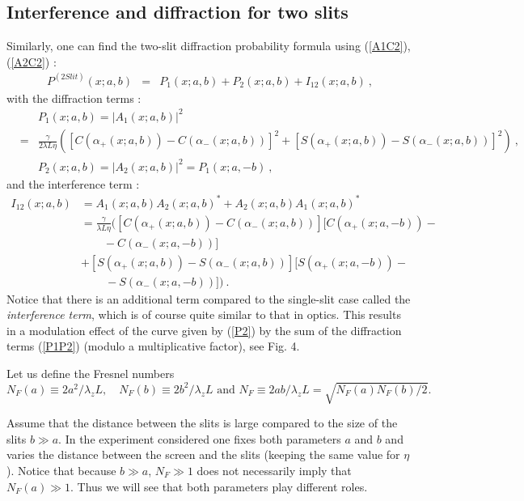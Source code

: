 \documentclass[12pt,aps,prb,preprint]{revtex4-1}   %
\begin{document}
\subsection{Interference and diffraction for two slits}
Similarly, one can find the two-slit diffraction probability
formula using (\ref{A1C2}), (\ref{A2C2}) :
\begin{eqnarray}\label{P2}
P^{(2 Slit)}(x;a,b) &=& P_1(x;a,b)+P_2(x;a,b)+I_{12}(x;a,b)\ ,
\end{eqnarray}
with the diffraction terms :
\begin{eqnarray}\label{P1P2}
&&P_1(x;a,b)= |A_1(x;a,b)|^2
{}\nonumber\\{}&=&\frac{\gamma}{2\lambda
L\eta}\left([C(\alpha_{+}(x;a,b))-C(\alpha_{-}(x;a,b))]^2+[S(\alpha_{+}(x;a,b))-S(\alpha_{-}(x;a,b))]^2\right)\
, {}\nonumber\\{}&& P_2(x;a,b) = |A_2(x;a,b)|^2 = P_1(x;a,-b)\ ,
\end{eqnarray}
and the interference term :
\begin{align}\label{I12}
I_{12}(x;a,b)&=A_1(x;a,b)A_2(x;a,b)^* + A_2(x;a,b) A_1(x;a,b)^*
{}\nonumber\\{}&=\frac{\gamma}{\lambda L\eta}
([C(\alpha_{+}(x;a,b))- C(\alpha_{-}(x;a,b))][C(\alpha_{+}(x;a,-b))- \nonumber\\ & \quad\quad - C(\alpha_{-}(x;a,-b))]
{}\nonumber\\{}&+[S(\alpha_{+}(x;a,b))-S(\alpha_{-}(x;a,b))][S(\alpha_{+}(x;a,-b))- \nonumber\\ & \quad\quad\, - S(\alpha_{-}(x;a,-b))])\ .
\end{align}
Notice that there is an additional term compared to the
single-slit case called the \textit{interference term}, which is
of course quite similar to that in optics.\cite{Optics} This
results in a modulation effect of the curve given by (\ref{P2}) by
the sum of the diffraction terms (\ref{P1P2}) (modulo a
multiplicative factor), see Fig. 4.

Let us define the Fresnel numbers
$$ N_F(a)\equiv2a^2/\lambda_z L, \quad
N_F(b)\equiv2b^2/\lambda_z L \mbox{ and } N_F\equiv2ab/\lambda_z L =
\sqrt{N_F(a)N_F(b)/2}.  $$


Assume that the distance between the slits is large compared to
the size of the slits $b\gg a$. In the experiment considered one
fixes both parameters $a$ and $b$ and varies the distance between
the screen and the slits (keeping the same value for $\eta$).
Notice that because $b\gg a$, $N_F\gg 1$ does not necessarily
imply that $N_F(a)\gg1$. Thus we will see that both parameters
play different roles.
\end{document}
